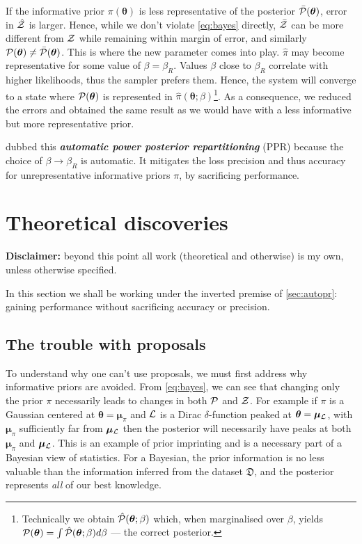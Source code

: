 \documentclass[usenatbib]{mnras}
\begin{document}
If the informative prior \(\pi (\bm{\theta})\) is less representative
of the posterior \( \bar{\cal P} (\bm{\theta})\), error in
$\hat{\cal Z}$ is larger. Hence, while we don't violate
\cref{eq:bayes} directly, $\bar{\cal Z}$ can be more different from
${\cal Z}$ while remaining within margin of error, and similarly
${\cal P}(\bm{\theta}) \ne \bar{\cal P}(\bm{\theta})$. This is where
the new parameter comes into play. $\hat{\pi}$ may become
representative for some value of $\beta = \beta_{R}$. Values $\beta$
close to $\beta_{R}$ correlate with higher likelihoods, thus the
sampler prefers them. Hence, the system will converge to a state where
\( {\cal P} (\bm{\theta})\) is represented in
\(\hat{\pi} (\bm{\theta};\beta)\)\footnote{Technically we obtain
  \( \hat{\cal P} (\bm{\theta};\beta)\) which, when marginalised over
  $\beta$, yields
  \( {\cal P} (\bm{\theta}) = \int \hat{\cal P} (\bm{\theta};\beta) d
  \beta\) --- the correct posterior.}.  As a consequence, we reduced
the errors and obtained the same result as we would have with a less
informative but more representative prior.

\cite{chen-ferroz-hobson} dubbed this \textbf{\emph{automatic power posterior
  repartitioning}} (PPR) because the choice of
$\beta\rightarrow\beta_{R}$ is automatic. It mitigates the loss
precision and thus accuracy for unrepresentative informative priors
$\pi$, by sacrificing performance.

\pagebreak[2]
\section{Theoretical discoveries}
\textbf{Disclaimer:} beyond this point all work (theoretical and
otherwise) is my own, unless otherwise specified.

In this section we shall be working under the inverted premise of
\cref{sec:autopr}: gaining performance without sacrificing accuracy or
precision.

\subsection{The trouble with proposals\label{sec:prejudice}}
To understand why one can't use proposals, we must first address why
informative priors are avoided. From \cref{eq:bayes}, we can see that
changing only the prior $\pi$ necessarily leads to changes in both
${\cal P}$ and ${\cal Z}$. For example if $\pi$ is a Gaussian centered
at $\bm{\theta}=\bm{\mu}_{\pi}$ and ${\cal L}$ is a Dirac
$\delta$-function peaked at $\bm{\theta}=\bm{\mu}_{{\cal L}}$, with
$\bm{\mu}_{\pi}$ sufficiently far from $\bm{\mu}_{{\cal L}}$ then the
posterior will necessarily have peaks at both $\bm{\mu}_{\pi}$ and
$\bm{\mu}_{{\cal L}}$. This is an example of prior imprinting and is a
necessary part of a Bayesian view of statistics. For a Bayesian, the
prior information is no less valuable than the information inferred
from the dataset \(\mathfrak{D}\), and the posterior represents
\emph{all} of our best knowledge.
\end{document}
